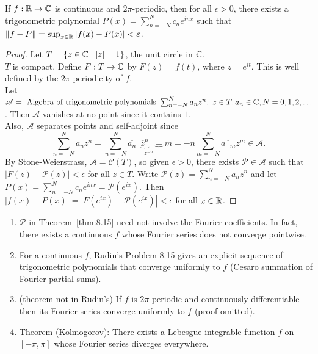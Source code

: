 \begin{thm}[15]
	If $f: \mathbb{R}\to \mathbb{C}$ is continuous and $2\pi$-periodic, then for all $\epsilon>0$, there exists a trigonometric polynomial $P(x)=\sum_{n=-N}^{N}{c_n e^{inx}}$ such that $\|f-P\|= \sup_{x \in \mathbb{R}} \left|f(x)-P(x)\right|<\varepsilon$.
	\begin{proof}
		Let $T=\{ z \in \mathbb{C} \mid \left|z\right|=1\}$, the unit circle in $\mathbb{C}$.\\
		$T$ is compact. Define $F: T\to \mathbb{C}$ by $F(z)=f(t)$, where $z=e^{it}$. This is well defined by the $2\pi$-periodicity of $f$.\\
		Let $\mathscr{A}=\text{ Algebra of trigonometric polynomials } \sum_{n=-N}^{N}{a_{n}z^{n}}, \,\, z \in T, a_{n} \in \mathbb{C}, N=0,1,2, \ldots $. Then $\mathscr{A}$ vanishes at no point since it contains $1$.\\
		Also, $\mathscr{A}$ separates points and self-adjoint since
		\[
			\sum_{n=-N}^{N}{a_{n}z^{n}}= \sum_{n=-N}^{N}{\overline{a_n} \underbrace{\overline{z}^{n}}_{=z^{-n}}}\underbrace{=}{m=-n} \sum_{m=-N}^{N}{\overline{a_{-m}} z^{m}} \in \mathscr{A}
			.\]
		By Stone-Weierstrass, $\overline{\mathscr{A}}= \mathscr{C}(T)$, so given $\epsilon>0$, there exists $\mathscr{P} \in \mathscr{A}$ such that $\left|F(z)-\mathscr{P}(z)\right|<\epsilon$ for all $z \in T$.
		Write $\mathscr{P}(z)=\sum_{n=-N}^{N}{a_n z^{n}}$ and let $P(x)=\sum_{n=-N}^{N}{c_n e^{inx}}= \mathscr{P}(e^{ix})$.
		Then $\left|f(x)-P(x)\right|=\left|F(e^{ix})-\mathscr{P}(e^{ix})\right|<\epsilon$ for all $x \in \mathbb{R}$.
	\end{proof}
	\begin{remark}
		\begin{enumerate}
			\item $\mathscr{P}$ in Theorem~\ref{thm:8.15} need not involve the Fourier coefficients. In fact, there exists a continuous $f$ whose Fourier series does not converge pointwise.
			\item For a continuous $f$, Rudin's Problem 8.15 gives an explicit sequence of trigonometric polynomials that converge uniformly to $f$ (Cesaro summation of Fourier partial sums).
			\item (theorem not in Rudin's) If $f$ is $2\pi$-periodic and continuously differentiable then its Fourier series converge uniformly to $f$ (proof omitted).
			\item Theorem (Kolmogorov): There exists a Lebesgue integrable function $f$ on $[-\pi,\pi]$ whose Fourier series diverges everywhere.
		\end{enumerate}
	\end{remark}
\end{thm}

